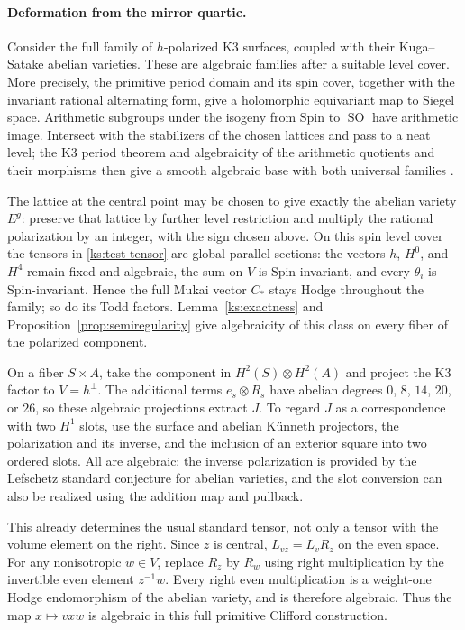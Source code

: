 \documentclass[11pt]{article}
\numberwithin{equation}{section}
\theoremstyle{definition}
\theoremstyle{remark}
\DeclareMathOperator{\SO}{SO}
\begin{document}
\paragraph{Deformation from the mirror quartic.}
Consider the full family of $h$-polarized K3 surfaces, coupled
with their Kuga--Satake abelian varieties.  These are algebraic families
after a suitable level cover.  More precisely, the primitive
period domain and its spin cover, together with the invariant
rational alternating form, give a holomorphic equivariant
map to Siegel space.  Arithmetic subgroups under the
isogeny from Spin to $\SO$ have arithmetic image.  Intersect
with the stabilizers of the chosen lattices and pass to a
neat level; the K3 period theorem and algebraicity of the
arithmetic quotients and their morphisms then give a smooth
algebraic base with both universal families
\cite{DeligneK3,BailyBorel,BorelAlgebraicity}.

The lattice at the central point may be chosen to give
exactly the abelian variety $E^g$: preserve that lattice
by further level restriction and multiply the rational
polarization by an integer, with the sign chosen above.
On this spin level cover the tensors in
\eqref{ks:test-tensor} are global parallel sections:
the vectors $h$, $H^0$, and $H^4$ remain fixed and algebraic, the
sum on $V$ is Spin-invariant, and every $\theta_i$ is
Spin-invariant.  Hence the full Mukai vector $C_*$ stays
Hodge throughout the family; so do its Todd factors.
Lemma~\ref{ks:exactness} and
Proposition~\ref{prop:semiregularity} give algebraicity
of this class on every fiber of the polarized component.

On a fiber $S\times A$, take the component in $H^2(S)\otimes H^2(A)$
and project the K3 factor to
$V=h^\perp$.  The additional terms $e_s\otimes R_s$ have
abelian degrees $0$, $8$, $14$, $20$, or $26$, so these
algebraic projections extract $J$.  To regard $J$ as a correspondence
with two $H^1$ slots, use the surface and abelian
K\"unneth projectors, the polarization and its inverse,
and the inclusion of an exterior square into two ordered
slots.  All are algebraic: the inverse polarization is
provided by the Lefschetz standard conjecture for abelian
varieties, and the slot conversion can also be realized
using the addition map and pullback.

This already determines the usual standard tensor, not
only a tensor with the volume element on the right.
Since $z$ is central, $L_{vz}=L_vR_z$ on the even space.
For any nonisotropic $w\in V$, replace $R_z$ by $R_w$
using right multiplication by the invertible even
element $z^{-1}w$.  Every right even multiplication is
a weight-one Hodge endomorphism of the abelian variety,
and is therefore algebraic.  Thus the map
$x\mapsto vxw$ is algebraic in this full primitive
Clifford construction.
\end{document}
